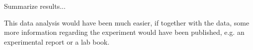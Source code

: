 \documentclass[aps,prx,reprint,amsmath,amssymb,superscriptaddress,showpacs]{revtex4-1}
\begin{document}
Summarize results...

This data analysis would have been much easier, if together with the data, some more information regarding the experiment would have been published, e.g. an experimental report or a lab book.






\end{document}
